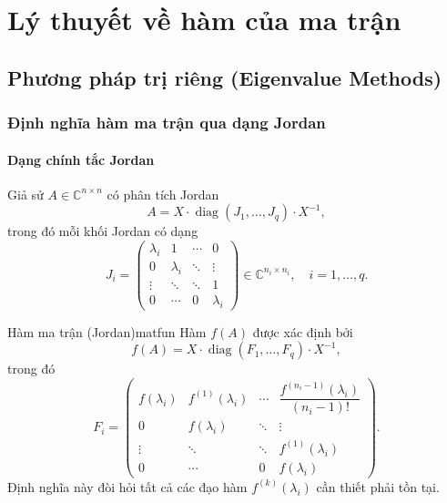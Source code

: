 \documentclass[12pt,a4paper]{report}
\newcommand{\C}{\mathbb{C}}
\newcommand{\diag}{\operatorname{diag}}
\begin{document}
\chapter{Lý thuyết về hàm của ma trận}

\section{Phương pháp trị riêng (Eigenvalue Methods)}
\label{sec:eigen}

\subsection{Định nghĩa hàm ma trận qua dạng Jordan}

\subsubsection{Dạng chính tắc Jordan}

Giả sử $A \in \C^{n \times n}$ có phân tích Jordan
\begin{equation}
  A = X \cdot \diag(J_1, \ldots, J_q) \cdot X^{-1},
  \label{eq:jcf}
\end{equation}
trong đó mỗi khối Jordan có dạng
\[
  J_i = \begin{pmatrix}
    \lambda_i & 1      & \cdots & 0      \\
    0         & \lambda_i & \ddots & \vdots \\
    \vdots    & \ddots & \ddots & 1      \\
    0         & \cdots & 0      & \lambda_i
  \end{pmatrix} \in \C^{n_i \times n_i}, \quad i = 1, \ldots, q.
\]

\begin{definition}{Hàm ma trận (Jordan)}{matfun}
Hàm $f(A)$ được xác định bởi
\[
  f(A) = X \cdot \diag(F_1, \ldots, F_q) \cdot X^{-1},
\]
trong đó
\[
  F_i = \begin{pmatrix}
    f(\lambda_i) & f^{(1)}(\lambda_i) & \cdots & \dfrac{f^{(n_i-1)}(\lambda_i)}{(n_i-1)!} \\[6pt]
    0            & f(\lambda_i)        & \ddots & \vdots                                      \\
    \vdots       & \ddots              & \ddots & f^{(1)}(\lambda_i)                          \\
    0            & \cdots              & 0      & f(\lambda_i)
  \end{pmatrix}.
\]
Định nghĩa này đòi hỏi tất cả các đạo hàm $f^{(k)}(\lambda_i)$ cần thiết phải tồn tại.
\end{definition}
\end{document}
